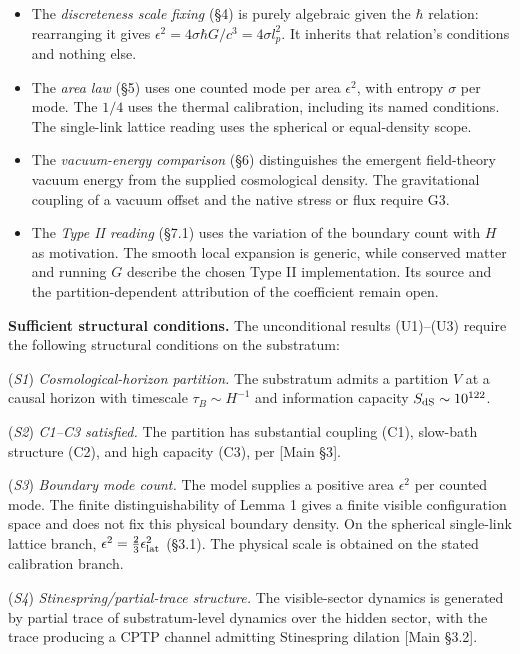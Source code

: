 \documentclass[
]{article}
\begin{document}
\begin{itemize}
\item
  The \emph{discreteness scale fixing} (§4) is purely algebraic given
  the \(\hbar\) relation: rearranging it gives
  \(\epsilon^2 = 4\sigma \hbar G/c^3 = 4\sigma l_p^2\). It inherits that
  relation's conditions and nothing else.
\item
  The \emph{area law} (§5) uses one counted mode per area
  \(\epsilon^2\), with entropy \(\sigma\) per mode. The \(1/4\) uses the
  thermal calibration, including its named conditions. The single-link
  lattice reading uses the spherical or equal-density scope.
\item
  The \emph{vacuum-energy comparison} (§6) distinguishes the emergent
  field-theory vacuum energy from the supplied cosmological density. The
  gravitational coupling of a vacuum offset and the native stress or
  flux require G3.
\item
  The \emph{Type II reading} (§7.1) uses the variation of the boundary
  count with \(H\) as motivation. The smooth local expansion is generic,
  while conserved matter and running \(G\) describe the chosen Type II
  implementation. Its source and the partition-dependent attribution of
  the coefficient remain open.
\end{itemize}

\textbf{Sufficient structural conditions.} The unconditional results
(U1)--(U3) require the following structural conditions on the
substratum:

(\emph{S1}) \emph{Cosmological-horizon partition.} The substratum admits
a partition \(V\) at a causal horizon with timescale
\(\tau_B \sim H^{-1}\) and information capacity
\(S_{\rm dS} \sim 10^{122}\).

(\emph{S2}) \emph{C1--C3 satisfied.} The partition has substantial
coupling (C1), slow-bath structure (C2), and high capacity (C3), per
{[}Main §3{]}.

(\emph{S3}) \emph{Boundary mode count.} The model supplies a positive
area \(\epsilon^2\) per counted mode. The finite distinguishability of
Lemma 1 gives a finite visible configuration space and does not fix this
physical boundary density. On the spherical single-link lattice branch,
\(\epsilon^2=\tfrac23\epsilon_{\rm lat}^2\) (§3.1). The physical scale
is obtained on the stated calibration branch.

(\emph{S4}) \emph{Stinespring/partial-trace structure.} The
visible-sector dynamics is generated by partial trace of
substratum-level dynamics over the hidden sector, with the trace
producing a CPTP channel admitting Stinespring dilation {[}Main §3.2{]}.
\end{document}

